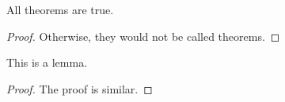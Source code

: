 \documentclass{article}
\begin{document}
\begin{theorem}
All theorems are true.
\end{theorem}

\begin{proof}{}
Otherwise, they would not be called theorems. 
\end{proof}

\begin{lemma}
This is a lemma. 
\end{lemma}

\begin{proof}{}
The proof is similar.
\end{proof}
\end{document}
